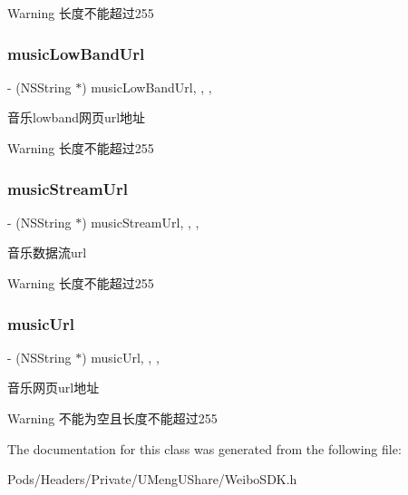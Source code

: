 \begin{DoxyWarning}{Warning}
长度不能超过255 
\end{DoxyWarning}
\mbox{\label{interface_w_b_music_object_a3171cc372068fe6381dbf92e1b9e3b81}} 
\subsubsection{\texorpdfstring{music\+Low\+Band\+Url}{musicLowBandUrl}}
{\footnotesize\ttfamily -\/ (N\+S\+String $\ast$) music\+Low\+Band\+Url\hspace{0.3cm}{\ttfamily [read]}, {\ttfamily [write]}, {\ttfamily [nonatomic]}, {\ttfamily [strong]}}

音乐lowband网页url地址

\begin{DoxyWarning}{Warning}
长度不能超过255 
\end{DoxyWarning}
\mbox{\label{interface_w_b_music_object_a8d15561b72b2037a38c9740b17661e2c}} 
\subsubsection{\texorpdfstring{music\+Stream\+Url}{musicStreamUrl}}
{\footnotesize\ttfamily -\/ (N\+S\+String $\ast$) music\+Stream\+Url\hspace{0.3cm}{\ttfamily [read]}, {\ttfamily [write]}, {\ttfamily [nonatomic]}, {\ttfamily [strong]}}

音乐数据流url

\begin{DoxyWarning}{Warning}
长度不能超过255 
\end{DoxyWarning}
\mbox{\label{interface_w_b_music_object_a3d68d45e9c8ba4db73bf2225697b762c}} 
\subsubsection{\texorpdfstring{music\+Url}{musicUrl}}
{\footnotesize\ttfamily -\/ (N\+S\+String $\ast$) music\+Url\hspace{0.3cm}{\ttfamily [read]}, {\ttfamily [write]}, {\ttfamily [nonatomic]}, {\ttfamily [strong]}}

音乐网页url地址

\begin{DoxyWarning}{Warning}
不能为空且长度不能超过255 
\end{DoxyWarning}


The documentation for this class was generated from the following file\+:\begin{DoxyCompactItemize}
\item 
Pods/\+Headers/\+Private/\+U\+Meng\+U\+Share/Weibo\+S\+D\+K.\+h\end{DoxyCompactItemize}
